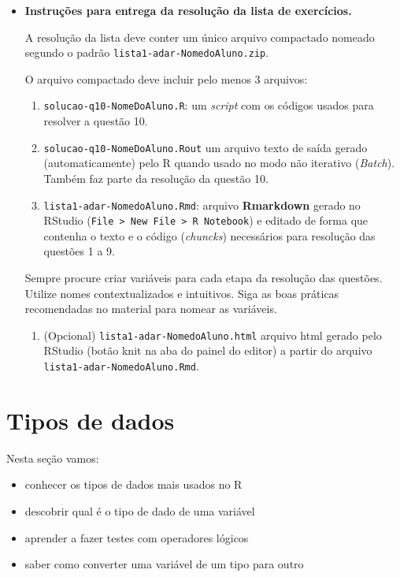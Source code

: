 \documentclass[]{book}
\providecommand{\tightlist}{%
  \setlength{\itemsep}{0pt}\setlength{\parskip}{0pt}}
\newenvironment{rmdblock}[1]
  {\begin{shaded*}
  \begin{itemize}
  \renewcommand{\labelitemi}{
    \raisebox{-.7\height}[0pt][0pt]{
      {\setkeys{Gin}{width=3em,keepaspectratio}\texttt{[image: images/\#1]}}
    }
  }
  \item
  }
  {
  \end{itemize}
  \end{shaded*}
  }
\newenvironment{rmdimportant}
  {\begin{rmdblock}{important}}
  {\end{rmdblock}}
\begin{document}
\begin{rmdimportant}
\textbf{Instruções para entrega da resolução da lista de exercícios.}

A resolução da lista deve conter um único arquivo compactado nomeado
segundo o padrão \texttt{lista1-adar-NomedoAluno.zip}.

O arquivo compactado deve incluir pelo menos 3 arquivos:

\begin{enumerate}
\def\labelenumi{\arabic{enumi}.}
\item
  \texttt{solucao-q10-NomeDoAluno.R}: um \emph{script} com os códigos
  usados para resolver a questão 10.
\item
  \texttt{solucao-q10-NomeDoAluno.Rout} um arquivo texto de saída gerado
  (automaticamente) pelo R quando usado no modo não iterativo
  (\emph{Batch}). Também faz parte da resolução da questão 10.
\item
  \texttt{lista1-adar-NomedoAluno.Rmd}: arquivo \textbf{Rmarkdown}
  gerado no RStudio
  (\texttt{File\ \textgreater{}\ New\ File\ \textgreater{}\ R\ Notebook})
  e editado de forma que contenha o texto e o código (\emph{chuncks})
  necessários para resolução das questões 1 a 9.
\end{enumerate}

Sempre procure criar variáveis para cada etapa da resolução das
questões. Utilize nomes contextualizados e intuitivos. Siga as boas
práticas recomendadas no material para nomear as variáveis.

\begin{enumerate}
\def\labelenumi{\arabic{enumi}.}
\setcounter{enumi}{3}
\tightlist
\item
  (Opcional) \texttt{lista1-adar-NomedoAluno.html} arquivo html gerado
  pelo RStudio (botão knit na aba do painel do editor) a partir do
  arquivo \texttt{lista1-adar-NomedoAluno.Rmd}.
\end{enumerate}
\end{rmdimportant}

\chapter{Tipos de dados}\label{datatype}

Nesta seção vamos:

\begin{itemize}
\tightlist
\item
  conhecer os tipos de dados mais usados no R
\item
  descobrir qual é o tipo de dado de uma variável
\item
  aprender a fazer testes com operadores lógicos
\item
  saber como converter uma variável de um tipo para outro
\end{itemize}
\end{document}
